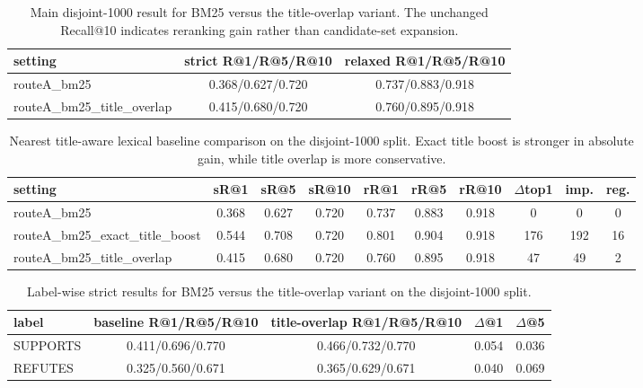 \begin{table}[t]
\centering
\caption{Main disjoint-1000 result for BM25 versus the title-overlap variant. The unchanged Recall@10 indicates reranking gain rather than candidate-set expansion.}
\begin{tabular}{lcc}
\hline
setting & strict R@1/R@5/R@10 & relaxed R@1/R@5/R@10 \\
\hline
routeA\_bm25 & 0.368/0.627/0.720 & 0.737/0.883/0.918 \\
routeA\_bm25\_title\_overlap & 0.415/0.680/0.720 & 0.760/0.895/0.918 \\
\hline
\end{tabular}
\end{table}

\begin{table}[t]
\centering
\caption{Nearest title-aware lexical baseline comparison on the disjoint-1000 split. Exact title boost is stronger in absolute gain, while title overlap is more conservative.}
\begin{tabular}{lccccccccc}
\hline
setting & sR@1 & sR@5 & sR@10 & rR@1 & rR@5 & rR@10 & $\Delta$top1 & imp. & reg. \\
\hline
routeA\_bm25 & 0.368 & 0.627 & 0.720 & 0.737 & 0.883 & 0.918 & 0 & 0 & 0 \\
routeA\_bm25\_exact\_title\_boost & 0.544 & 0.708 & 0.720 & 0.801 & 0.904 & 0.918 & 176 & 192 & 16 \\
routeA\_bm25\_title\_overlap & 0.415 & 0.680 & 0.720 & 0.760 & 0.895 & 0.918 & 47 & 49 & 2 \\
\hline
\end{tabular}
\end{table}

\begin{table}[t]
\centering
\caption{Label-wise strict results for BM25 versus the title-overlap variant on the disjoint-1000 split.}
\begin{tabular}{lcccc}
\hline
label & baseline R@1/R@5/R@10 & title-overlap R@1/R@5/R@10 & $\Delta$@1 & $\Delta$@5 \\
\hline
SUPPORTS & 0.411/0.696/0.770 & 0.466/0.732/0.770 & 0.054 & 0.036 \\
REFUTES & 0.325/0.560/0.671 & 0.365/0.629/0.671 & 0.040 & 0.069 \\
\hline
\end{tabular}
\end{table}

